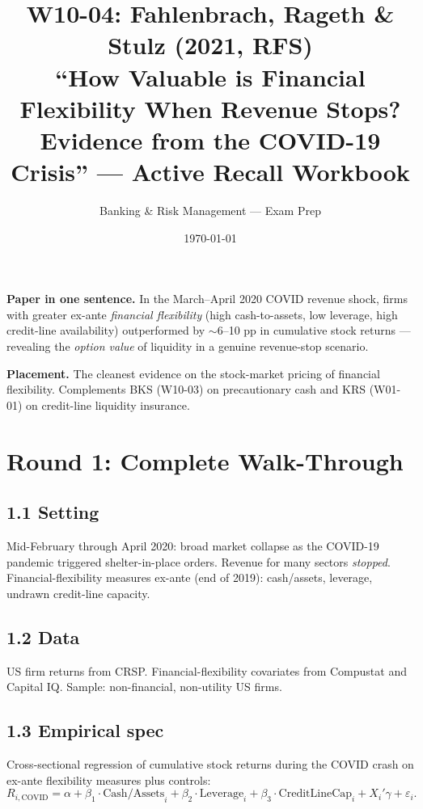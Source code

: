 \documentclass[11pt]{article}
\title{W10-04: Fahlenbrach, Rageth \& Stulz (2021, RFS) \\
\large ``How Valuable is Financial Flexibility When Revenue Stops? Evidence from the COVID-19 Crisis'' --- Active Recall Workbook}
\author{Banking \& Risk Management --- Exam Prep}
\date{\today}
\begin{document}
\maketitle

\begin{keybox}
\textbf{Paper in one sentence.} In the March--April 2020 COVID revenue shock, firms with greater ex-ante \emph{financial flexibility} (high cash-to-assets, low leverage, high credit-line availability) outperformed by $\sim$6--10 pp in cumulative stock returns --- revealing the \emph{option value} of liquidity in a genuine revenue-stop scenario.

\textbf{Placement.} The cleanest evidence on the stock-market pricing of financial flexibility. Complements BKS (W10-03) on precautionary cash and KRS (W01-01) on credit-line liquidity insurance.
\end{keybox}

\section*{Round 1: Complete Walk-Through}

\subsection*{1.1 Setting}
Mid-February through April 2020: broad market collapse as the COVID-19 pandemic triggered shelter-in-place orders. Revenue for many sectors \emph{stopped}. Financial-flexibility measures ex-ante (end of 2019): cash/assets, leverage, undrawn credit-line capacity.

\subsection*{1.2 Data}
US firm returns from CRSP. Financial-flexibility covariates from Compustat and Capital IQ. Sample: non-financial, non-utility US firms.

\subsection*{1.3 Empirical spec}
Cross-sectional regression of cumulative stock returns during the COVID crash on ex-ante flexibility measures plus controls:
\[
R_{i,\text{COVID}}=\alpha+\beta_1\cdot\text{Cash/Assets}_i+\beta_2\cdot\text{Leverage}_i+\beta_3\cdot\text{CreditLineCap}_i+X_i'\gamma+\varepsilon_i.
\]
\end{document}
